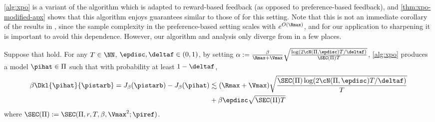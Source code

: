 \cref{alg:xpo} is a variant of the \xpo algorithm which is adapted
to reward-based feedback (as opposed to preference-based feedback),
and \cref{thm:xpo-modified-apx} shows that this algorithm enjoys
guarantees similar to those of \cite{xie2024exploratory} for this
setting. Note that this is not an immediate corollary of the results in \iftoggle{workshop}{\cite{xie2024exploratory}}{\citet{xie2024exploratory}}, since the sample complexity in the preference-based setting scales with $e^{O(\Rmax)}$, and for our application to sharpening it is important to avoid this dependence. However, our algorithm and analysis only diverge from \iftoggle{workshop}{\cite{xie2024exploratory}}{\citet{xie2024exploratory}} in a few places.

\begin{theorem}\label{thm:xpo-modified-apx}
Suppose that
 hold. For
any $T \in \NN$, $\epdisc,\deltaf \in (0,1)$, by setting $\alpha := \frac{\beta}{\Rmax+\Vmax} \sqrt{\frac{\log(2\cN(\Pi,\epdisc)T/\deltaf)}{\SEC(\Pi) T}}$, \cref{alg:xpo} produces a model $\pihat \in \Pi$ such that with probability at least $1-\deltaf$,
\begin{align}
\beta\Dkl{\pihat}{\pistarb} = J_\beta(\pistarb) - J_\beta(\pihat) &\lesssim 
(\Rmax+\Vmax) \sqrt{\frac{\SEC(\Pi)\log(2\cN(\Pi,\epdisc)T/\deltaf)}{T}} \\ 
&+ \beta\epdisc \sqrt{\SEC(\Pi)T}
\end{align}
where $\SEC(\Pi) := \SEC(\Pi, r, T, \beta, \Vmax^2; \piref)$.
\end{theorem}
